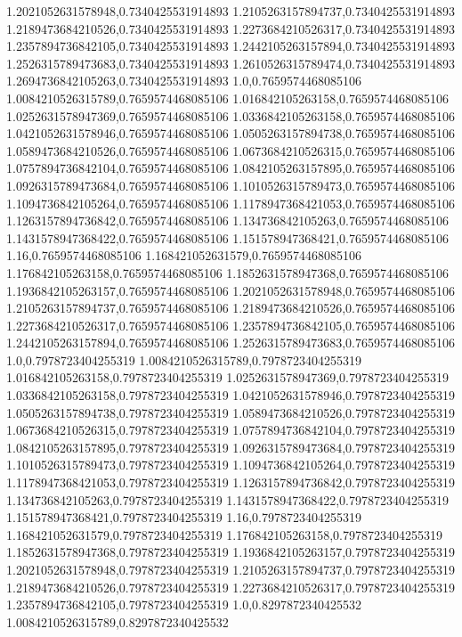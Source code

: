 1.2021052631578948,0.7340425531914893
1.2105263157894737,0.7340425531914893
1.2189473684210526,0.7340425531914893
1.2273684210526317,0.7340425531914893
1.2357894736842105,0.7340425531914893
1.2442105263157894,0.7340425531914893
1.2526315789473683,0.7340425531914893
1.2610526315789474,0.7340425531914893
1.2694736842105263,0.7340425531914893
1.0,0.7659574468085106
1.0084210526315789,0.7659574468085106
1.016842105263158,0.7659574468085106
1.0252631578947369,0.7659574468085106
1.0336842105263158,0.7659574468085106
1.0421052631578946,0.7659574468085106
1.0505263157894738,0.7659574468085106
1.0589473684210526,0.7659574468085106
1.0673684210526315,0.7659574468085106
1.0757894736842104,0.7659574468085106
1.0842105263157895,0.7659574468085106
1.0926315789473684,0.7659574468085106
1.1010526315789473,0.7659574468085106
1.1094736842105264,0.7659574468085106
1.1178947368421053,0.7659574468085106
1.1263157894736842,0.7659574468085106
1.134736842105263,0.7659574468085106
1.1431578947368422,0.7659574468085106
1.151578947368421,0.7659574468085106
1.16,0.7659574468085106
1.168421052631579,0.7659574468085106
1.176842105263158,0.7659574468085106
1.1852631578947368,0.7659574468085106
1.1936842105263157,0.7659574468085106
1.2021052631578948,0.7659574468085106
1.2105263157894737,0.7659574468085106
1.2189473684210526,0.7659574468085106
1.2273684210526317,0.7659574468085106
1.2357894736842105,0.7659574468085106
1.2442105263157894,0.7659574468085106
1.2526315789473683,0.7659574468085106
1.0,0.7978723404255319
1.0084210526315789,0.7978723404255319
1.016842105263158,0.7978723404255319
1.0252631578947369,0.7978723404255319
1.0336842105263158,0.7978723404255319
1.0421052631578946,0.7978723404255319
1.0505263157894738,0.7978723404255319
1.0589473684210526,0.7978723404255319
1.0673684210526315,0.7978723404255319
1.0757894736842104,0.7978723404255319
1.0842105263157895,0.7978723404255319
1.0926315789473684,0.7978723404255319
1.1010526315789473,0.7978723404255319
1.1094736842105264,0.7978723404255319
1.1178947368421053,0.7978723404255319
1.1263157894736842,0.7978723404255319
1.134736842105263,0.7978723404255319
1.1431578947368422,0.7978723404255319
1.151578947368421,0.7978723404255319
1.16,0.7978723404255319
1.168421052631579,0.7978723404255319
1.176842105263158,0.7978723404255319
1.1852631578947368,0.7978723404255319
1.1936842105263157,0.7978723404255319
1.2021052631578948,0.7978723404255319
1.2105263157894737,0.7978723404255319
1.2189473684210526,0.7978723404255319
1.2273684210526317,0.7978723404255319
1.2357894736842105,0.7978723404255319
1.0,0.8297872340425532
1.0084210526315789,0.8297872340425532
